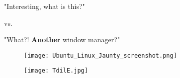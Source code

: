 \documentclass[xetex,serif,compress]{beamer}
\begin{document}
\newcommand{\mslide}[2]{
    \begin{frame}{#1}
        \begin{center}
        \begin{list}{$\bullet$}{\itemsep=1em}
            #2
        \end{list}
        \end{center}
    \end{frame}
}


\begin{frame}{}
\begin{center}
\huge
"Interesting, what is this?"

\vspace*{1cm}

vs.

\vspace*{1cm}

"What?! \textbf{Another} window manager?"
\end{center}
\end{frame}


\begin{frame}{}
    \begin{figure}
    \texttt{[image: Ubuntu\_Linux\_Jaunty\_screenshot.png]}
    \end{figure}
\end{frame}


\begin{frame}{}
\begin{center}
    \begin{figure}
    \texttt{[image: TdilE.jpg]}
    \end{figure}
\end{center}
\end{frame}
\end{document}
